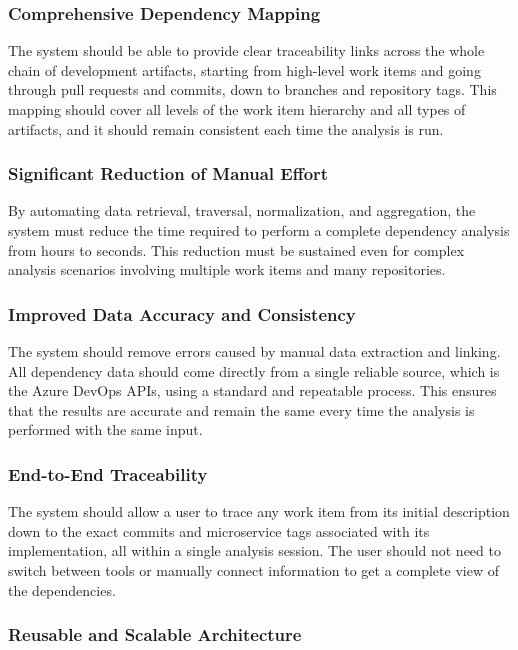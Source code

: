 \subsubsection{Comprehensive Dependency Mapping}

The system should be able to provide clear traceability links across
the whole chain of development artifacts, starting from high-level work items
and going through pull requests and commits, down to branches and repository
tags. This mapping should cover all levels of the work item hierarchy and all
types of artifacts, and it should remain consistent each time the analysis is run.

\subsubsection{Significant Reduction of Manual Effort}

By automating data retrieval, traversal, normalization, and aggregation, the
system must reduce the time required to perform a complete dependency analysis
from hours to seconds. This reduction must be sustained even for complex
analysis scenarios involving multiple work items and many repositories.

\subsubsection{Improved Data Accuracy and Consistency}

The system should remove errors caused by manual data extraction and linking.
All dependency data should come directly from a single reliable source, which
is the Azure DevOps APIs, using a standard and repeatable process. This ensures
that the results are accurate and remain the same every time the analysis is
performed with the same input.

\subsubsection{End-to-End Traceability}

The system should allow a user to trace any work item from its initial
description down to the exact commits and microservice tags associated with its implementation,
all within a single analysis session. The user should not need to switch
between tools or manually connect information to get a complete view of
the dependencies.

\subsubsection{Reusable and Scalable Architecture}

